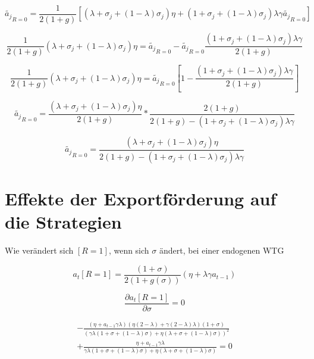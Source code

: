 \begin{equation}
\tilde{a_j}_{R=0} =\frac{1}{2(1+g)}[(\lambda+\sigma_j+(1-\lambda)\sigma_j)\eta+(1+\sigma_j+(1-\lambda)\sigma_j)\lambda\gamma\tilde{a_j}_{R=0}]
\end{equation}


\begin{equation}
\frac{1}{2(1+g)}(\lambda+\sigma_j+(1-\lambda)\sigma_j)\eta = \tilde{a_j}_{R=0}-\tilde{a_j}_{R=0}\frac{(1+\sigma_j+(1-\lambda)\sigma_j)\lambda\gamma}{2(1+g)}
\end{equation}


\begin{equation}
\frac{1}{2(1+g)}(\lambda+\sigma_j+(1-\lambda)\sigma_j)\eta = \tilde{a_j}_{R=0}\left[1-\frac{(1+\sigma_j+(1-\lambda)\sigma_j)\lambda\gamma}{2(1+g)}\right]
\end{equation}

\begin{equation}
\tilde{a_j}_{R=0} = \frac{(\lambda+\sigma_j+(1-\lambda)\sigma_j)\eta}{2(1+g)}*\frac{2(1+g)}{2(1+g)-(1+\sigma_j+(1-\lambda)\sigma_j)\lambda\gamma}
\end{equation}


\begin{equation}
\boxed{\tilde{a_j}_{R=0} = \frac{(\lambda+\sigma_j+(1-\lambda)\sigma_j)\eta}{2(1+g)-(1+\sigma_j+(1-\lambda)\sigma_j)\lambda\gamma}}
\end{equation}


\section[Effekte der Exportförderung auf die Strategien]{Effekte der Exportförderung auf die Strategien }\label{math:Effekte}


Wie verändert sich $[R=1]$, wenn sich $\sigma$ ändert, bei einer endogenen WTG


\begin{equation}
a_t [R=1]=\frac{(1+\sigma)}{2(1+g(\sigma))}(\eta+\lambda\gamma a_{t-1})
\end{equation}


\begin{equation}
\frac{\partial a_t[R=1]}{\partial\sigma}=0
\end{equation}


\begin{equation}
\begin{split}-\frac{(\eta+a_{t-1}\gamma\lambda)(\eta(2-\lambda)+\gamma(2-\lambda)\lambda)(1+\sigma)}{(\gamma\lambda(1+\sigma+(1-\lambda)\sigma)+\eta(\lambda+\sigma+(1-\lambda)\sigma))^2}\\
+\frac{\eta+a_{t-1}\gamma\lambda}{\gamma\lambda(1+\sigma+(1-\lambda)\sigma)+\eta(\lambda+\sigma+(1-\lambda)\sigma)}=0
\end{split}
\end{equation}


